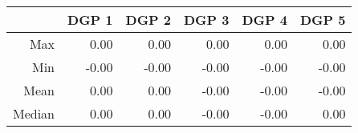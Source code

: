 \begin{table}[ht]
\centering
\begin{tabular}{rrrrrr}
  \hline
 & DGP 1 & DGP 2 & DGP 3 & DGP 4 & DGP 5 \\ 
  \hline
Max & 0.00 & 0.00 & 0.00 & 0.00 & 0.00 \\ 
  Min & -0.00 & -0.00 & -0.00 & -0.00 & -0.00 \\ 
  Mean & 0.00 & 0.00 & -0.00 & -0.00 & -0.00 \\ 
  Median & 0.00 & 0.00 & -0.00 & -0.00 & 0.00 \\ 
   \hline
\end{tabular}
\end{table}
